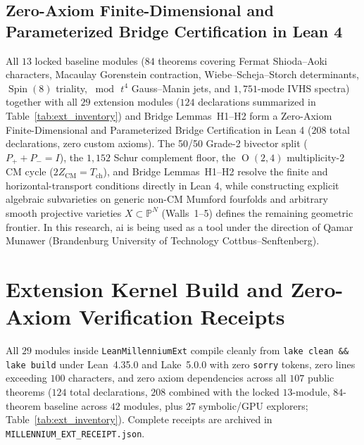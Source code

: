 \documentclass[11pt,a4paper]{article}
\begin{document}
\subsection{Zero-Axiom Finite-Dimensional and Parameterized Bridge Certification in Lean 4}
All $13$ locked baseline modules ($84$ theorems covering Fermat Shioda--Aoki characters, Macaulay Gorenstein contraction, Wiebe--Scheja--Storch determinants, $\operatorname{Spin}(8)$ triality, $\bmod\, t^4$ Gauss--Manin jets, and $1{,}751$-mode IVHS spectra) together with all $29$ extension modules ($124$ declarations summarized in Table~\ref{tab:ext_inventory}) and Bridge Lemmas~H1--H2 form a Zero-Axiom Finite-Dimensional and Parameterized Bridge Certification in Lean 4 ($208$ total declarations, zero custom axioms). The 50/50 Grade-2 bivector split ($P_+ + P_- = I$), the $1{,}152$ Schur complement floor, the $\operatorname{O}(2,4)$ multiplicity-2 CM cycle ($2 Z_{\mathrm{CM}} = T_{\mathrm{ch}}$), and Bridge Lemmas~H1--H2 resolve the finite and horizontal-transport conditions directly in Lean 4, while constructing explicit algebraic subvarieties on generic non-CM Mumford fourfolds and arbitrary smooth projective varieties $X \subset \mathbb{P}^N$ (Walls~1--5) defines the remaining geometric frontier. In this research, ai is being used as a tool under the direction of Qamar Munawer (Brandenburg University of Technology Cottbus--Senftenberg).

\appendix
\section{Extension Kernel Build and Zero-Axiom Verification Receipts}

All $29$ modules inside \texttt{LeanMillenniumExt} compile cleanly from \texttt{lake clean \&\& lake build} under Lean~4.35.0 and Lake~5.0.0 with zero \texttt{sorry} tokens, zero lines exceeding $100$ characters, and zero axiom dependencies across all $107$ public theorems ($124$ total declarations, $208$ combined with the locked $13$-module, $84$-theorem baseline across $42$ modules, plus $27$ symbolic/GPU explorers; Table~\ref{tab:ext_inventory}). Complete receipts are archived in \texttt{MILLENNIUM\_EXT\_RECEIPT.json}.
\end{document}
